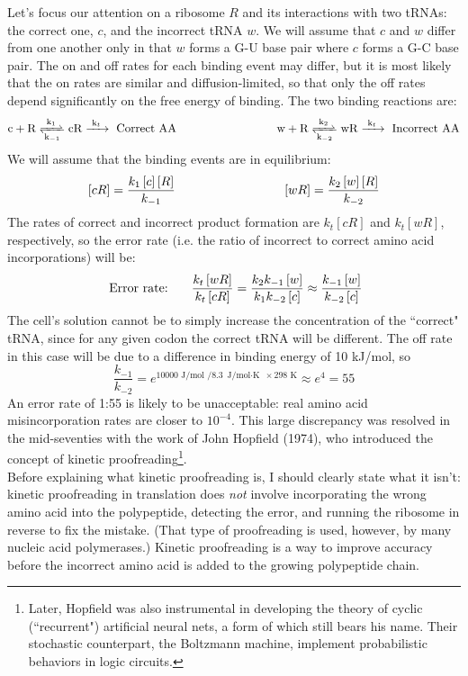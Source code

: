 \documentclass{article}
\begin{document}
Let's focus our attention on a ribosome $R$ and its interactions with two tRNAs: the correct one, $c$, and the incorrect tRNA $w$. We will assume that $c$ and $w$ differ from one another only in that $w$ forms a G-U base pair where $c$ forms a G-C base pair. The on and off rates for each binding event may differ, but it is most likely that the on rates are similar and diffusion-limited, so that only the off rates depend significantly on the free energy of binding. The two binding reactions are:
\[ \ce{c + R <=>[k_1][k_{-1}] cR ->[k_t] \textrm{ Correct AA}} \hspace{3 cm} \ce{w + R <=>[k_2][k_{-2}] wR ->[k_t] \textrm{ Incorrect AA}} \]
We will assume that the binding events are in equilibrium:
\[ \left[ c R \right] = \frac{k_1\left[ c \right]\left[ R \right]}{k_{-1}} \hspace{3 cm} \left[ w R \right] = \frac{k_2\left[ w \right]\left[ R \right]}{k_{-2}} \]
The rates of correct and incorrect product formation are $k_t [cR]$ and $k_t [wR]$, respectively, so the error rate (i.e. the ratio of incorrect to correct amino acid incorporations) will be:
\[ \textrm{ Error rate: } \hspace{0.5 cm} \frac{k_t  \left[ w R \right]  }{k_t  \left[ c R \right] } = \frac{k_2k_{-1}  \left[ w \right]  }{k_1k_{-2}  \left[ c \right] } \approx  \frac{k_{-1}  \left[ w \right]  }{k_{-2}  \left[ c \right] }  \]
The cell's solution cannot be to simply increase the concentration of the ``correct" tRNA, since for any given codon the correct tRNA will be different. The off rate in this case will be due to a difference in binding energy of 10 kJ/mol, so
\[ \frac{k_{-1}}{k_{-2}} = e^{10000 \textrm{ J/mol } / 8.3 \textrm{ J/mol$\cdot$K } \times 298 \textrm{ K}} \approx e^4 = 55 \]
An error rate of 1:55 is likely to be unacceptable: real amino acid misincorporation rates are closer to $10^{-4}$. This large discrepancy was resolved in the mid-seventies with the work of John Hopfield (1974), who introduced the concept of kinetic proofreading\footnote{Later, Hopfield was also instrumental in developing the theory of cyclic (``recurrent") artificial neural nets, a form of which still bears his name. Their stochastic counterpart, the Boltzmann machine, implement probabilistic behaviors in logic circuits. }.\\

Before explaining what kinetic proofreading is, I should clearly state what it isn't: kinetic proofreading in translation does \textit{not} involve incorporating the wrong amino acid into the polypeptide, detecting the error, and running the ribosome in reverse to fix the mistake. (That type of proofreading is used, however, by many nucleic acid polymerases.) Kinetic proofreading is a way to improve accuracy before the incorrect amino acid is added to the growing polypeptide chain.
\end{document}
